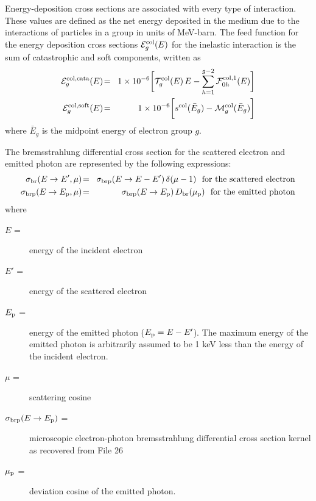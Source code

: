 Energy-deposition cross sections are associated with every type of interaction.
These values are defined as the net energy deposited in the medium due to the
interactions of particles in a group in units of MeV-barn. The feed function
for the energy deposition cross sections ${\cal E}_g^{\rm col}(E)$ for the
inelastic interaction is the sum of catastrophic and soft components,
written as
  \begin{eqnarray}
  \nonumber {\cal E}_g^{\rm col,cata}(E)\negthinspace &=&\negthinspace 1\times
  10^{-6}\bigg[{\cal T}^{\rm col}_g(E)\, E -\sum_{h=1}^{g-2}
  {\cal F}^{{\rm col},1}_{0 h}(E)\bigg] \\
  {\cal E}_g^{\rm col,soft}(E)\negthinspace &=&\negthinspace 1\times
  10^{-6}\bigg[ s^{\rm col}(\bar E_g) - {\cal M}^{\rm col}_g(\bar E_g)\bigg]
  \label{elr_eq13}
  \end{eqnarray}
\noindent where $\bar E_g$ is the midpoint energy of electron group $g$.

The bremsstrahlung differential cross section
 for the scattered electron and emitted
photon are represented by the following expressions:
  \begin{eqnarray}
    \nonumber \sigma_{\rm br}(E\rightarrow E',\mu) \negthinspace &=&
    \negthinspace\sigma_{\rm brp}(E\rightarrow E-E') \, \delta(\mu-1) \ \
    {\rm for \ the \ scattered \ electron} \\
    \sigma_{\rm brp}(E\rightarrow E_{\rm p},\mu) \negthinspace &=&
    \negthinspace\sigma_{\rm brp}(E\rightarrow E_{\rm p})
    \, D_{\rm br}(\mu_{\rm p}) \ \ {\rm for \ the \ emitted \ photon}
  \label{elr_eq14}
  \end{eqnarray}
\noindent where
\begin{description}
\item [$E$ =] energy of the incident electron
\item [$E'$ =] energy of the scattered electron
\item [$E_{\rm p}$ =] energy of the emitted photon ($E_{\rm p}=E-E'$). The
maximum energy of the emitted photon is arbitrarily assumed to be 1 keV
less than the energy of the incident electron.
\item [$\mu$ =] scattering cosine
\item [$\sigma_{\rm brp}(E\rightarrow E_{\rm p})$ =]
microscopic electron-photon bremsstrahlung differential cross section
kernel as recovered from File 26
\item [$\mu_{\rm p}$ =] deviation cosine of the emitted photon.
\end{description}

